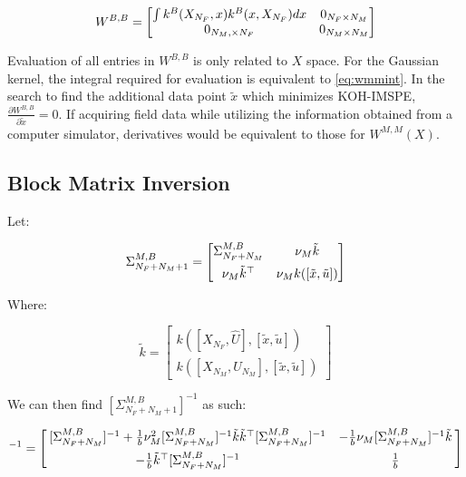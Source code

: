 \documentclass[
]{article}
\begin{document}
\begin{equation}
W^{B,B}=
\begin{bmatrix}
\int k^{B}(X_{N_F}, x)k^{B}(x,X_{N_F}) dx & 0_{N_F \times N_M}\\
0_{N_M, \times N_F} & 0_{N_M \times N_M}
\end{bmatrix}
\notag
\end{equation}

Evaluation of all entries in \(W^{B,B}\) is only related to \(X\) space. For
the Gaussian kernel, the integral required for evaluation is equivalent
to \eqref{eq:wmmint}. In the search to find the additional data point
\(\tilde{x}\) which minimizes KOH-IMSPE,
\(\frac{\partial W^{B,B}}{\partial \tilde{x}} = 0\). If acquiring field data while utilizing the information obtained from a computer simulator, derivatives would be equivalent to those for \(W^{M,M}(X)\).

\hypertarget{blockmatrixA}{%
\subsection{Block Matrix Inversion}\label{blockmatrixA}}

Let:

\begin{equation}
\Sigma^{M,B}_{N_F + N_M + 1} = 
\begin{bmatrix}
\Sigma^{M,B}_{N_F + N_M} & \nu_M \tilde{k}\\[5pt]
\nu_M \tilde{k}^{\top} & \nu_M k([\tilde{x}, \tilde{u}])
\end{bmatrix}
\notag
\end{equation}

Where:

\begin{equation}
\tilde{k} =
\begin{bmatrix}
k([X_{N_F}, \hat{U}], [\tilde{x}, \tilde{u}])\\[5pt]
k([X_{N_M}, U_{N_M}], [\tilde{x}, \tilde{u}])
\end{bmatrix}
\end{equation}

We can then find \([\Sigma_{N_F + N_M + 1}^{M,B}]^{-1}\) as such:

\begin{equation}
[\Sigma_{N_F + N_M + 1}^{M,B}]^{-1} =
\begin{bmatrix}
\kern2pt [\Sigma^{M,B}_{N_F + N_M}]^{-1} + \frac{1}{b}\nu_M^2[\Sigma^{M,B}_{N_F + N_M}]^{-1}\tilde{k}\tilde{k}^{\top}[\Sigma^{M,B}_{N_F + N_M}]^{-1} & -\frac{1}{b}\nu_M[\Sigma^{M,B}_{N_F + N_M}]^{-1}\tilde{k}\kern2pt\\[5pt]
\kern2pt -\frac{1}{b}\tilde{k}^{\top}[\Sigma^{M,B}_{N_F + N_M}]^{-1} & \frac{1}{b}\kern2pt
\end{bmatrix}
\label{eq:bmatrixinv}
\end{equation}
\end{document}
